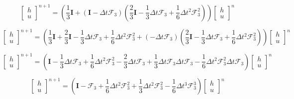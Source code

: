 \documentclass[12pt]{article}
\begin{document}
\[\left[\begin{array}{c}
h \\ u
\end{array}\right]^{n+1} = \left(\frac{1}{3}\boldsymbol{I} + (\boldsymbol{I} - \Delta t\boldsymbol{\mathcal{F}}_3 )\left(\frac{2}{3}\boldsymbol{I}  -  \frac{1}{3}\Delta t\boldsymbol{\mathcal{F}}_3 + \frac{1}{6}\Delta t^2\boldsymbol{\mathcal{F}}_3^2 \right) \right)\left[\begin{array}{c}
h \\ u
\end{array}\right]^n\]

\[\left[\begin{array}{c}
h \\ u
\end{array}\right]^{n+1} = \left(\frac{1}{3}\boldsymbol{I} + \frac{2}{3}\boldsymbol{I}  -  \frac{1}{3}\Delta t\boldsymbol{\mathcal{F}}_3 + \frac{1}{6}\Delta t^2\boldsymbol{\mathcal{F}}_3^2 + (- \Delta t\boldsymbol{\mathcal{F}}_3 )\left(\frac{2}{3}\boldsymbol{I}  -  \frac{1}{3}\Delta t\boldsymbol{\mathcal{F}}_3 + \frac{1}{6}\Delta t^2\boldsymbol{\mathcal{F}}_3^2 \right) \right)\left[\begin{array}{c}
h \\ u
\end{array}\right]^n\]

\[\left[\begin{array}{c}
h \\ u
\end{array}\right]^{n+1} = \left(\boldsymbol{I}  -  \frac{1}{3}\Delta t\boldsymbol{\mathcal{F}}_3 + \frac{1}{6}\Delta t^2\boldsymbol{\mathcal{F}}_3^2 -\frac{2}{3} \Delta t\boldsymbol{\mathcal{F}}_3   + \frac{1}{3}\Delta t\boldsymbol{\mathcal{F}}_3 \Delta t\boldsymbol{\mathcal{F}}_3 - \frac{1}{6}\Delta t^2\boldsymbol{\mathcal{F}}_3^2 \Delta t\boldsymbol{\mathcal{F}}_3 \right) \left[\begin{array}{c}
h \\ u
\end{array}\right]^n\]

\[\left[\begin{array}{c}
h \\ u
\end{array}\right]^{n+1} = \left(\boldsymbol{I}  -  \boldsymbol{\mathcal{F}}_3 + \frac{1}{6}\Delta t^2\boldsymbol{\mathcal{F}}_3^2   + \frac{1}{3}\Delta t^2\boldsymbol{\mathcal{F}}_3^2- \frac{1}{6}\Delta t^3\boldsymbol{\mathcal{F}}_3^3 \right) \left[\begin{array}{c}
h \\ u
\end{array}\right]^n\]
\end{document}
